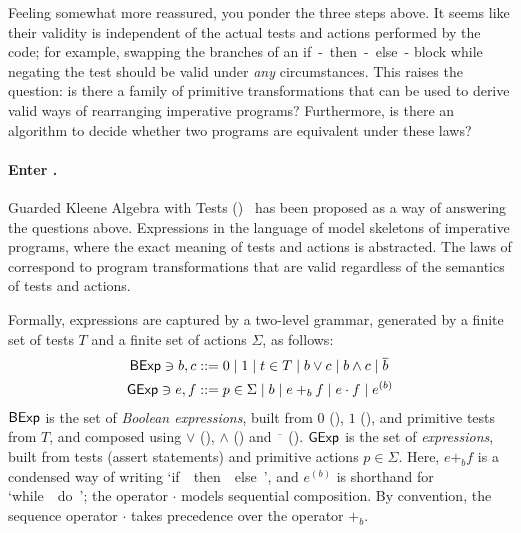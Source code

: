 \documentclass[orivec,envcountsect,envcountsame]{llncs}
\begin{document}
    Feeling somewhat more reassured, you ponder the three steps above.
    It seems like their validity is independent of the actual tests and actions performed by the code; for example, swapping the branches of an \textsf{if~-~then~-~else~-} block while negating the test should be valid under \emph{any} circumstances.
    This raises the question: is there a family of primitive transformations that can be used to derive valid ways of rearranging imperative programs?
    Furthermore, is there an algorithm to decide whether two programs are equivalent under these laws?

    \paragraph{\bf Enter \GKAT.}
    Guarded Kleene Algebra with Tests (\GKAT)~\cite{gkatpopl} has been proposed as a way of answering the questions above.
    Expressions in the language of \GKAT model skeletons of imperative programs, where the exact meaning of tests and actions is abstracted.
    The laws of \GKAT correspond to program transformations that are valid regardless of the semantics of tests and actions.

    Formally, \GKAT expressions are captured by a two-level grammar, generated by a finite set of tests $T$ and a finite set of actions $\Sigma$, as follows:
    \begin{align*}
        \mathsf{BExp} \ni b, c &::= 0 \mid 1 \mid t \in T \mid b \vee c \mid b \wedge c \mid \overline{b} \\
        \mathsf{GExp} \ni e, f &::= p \in \Sigma \mid b \mid e +_b f \mid e \cdot f \mid e^{(b)}
    \end{align*}
    \(\mathsf{BExp}\) is the set of \emph{Boolean expressions}, built from $0$ (), $1$ (), and primitive tests from $T$, and composed using $\vee$ (), $\wedge$ () and $\overline{\phantom{a}}$ ().
    \(\mathsf{GExp}\) is the set of \GKAT \emph{expressions}, built from tests (\textsf{assert} statements) and primitive actions $p \in \Sigma$.
    Here, $e +_b f$ is a condensed way of writing \textsf{`if~~then~~else~'}, and $e^{(b)}$ is shorthand for \textsf{`while~~do~'}; the operator $\cdot$ models sequential composition.
    By convention, the sequence operator $\cdot$ takes precedence over the operator $+_b$.
\end{document}
